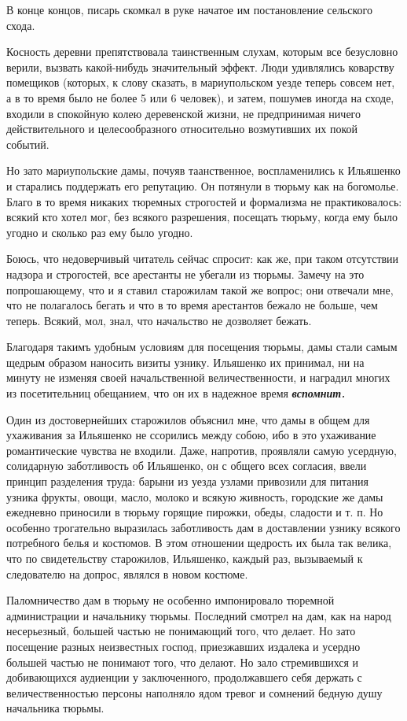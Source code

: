 \documentclass[a4paper,20pt]{report}
\begin{document}
В конце концов, писарь скомкал в руке начатое им постановление сельского схода.

Косность деревни препятствовала таинственным слухам, которым все безусловно
верили, вызвать какой-нибудь значительный эффект. Люди удивлялись коварству
помещиков (которых, к слову сказать, в мариупольском уезде теперь совсем нет, а
в то время было не более 5 или 6 человек), и затем, пошумев иногда на сходе,
входили в спокойную колею деревенской жизни, не предпринимая ничего
действительного и целесообразного относительно возмутивших их покой событий.

Но зато мариупольские дамы, почуяв таанственное, воспламенились к Ильяшенко и
старались поддержать его репутацию. Он потянули в тюрьму как на богомолье.
Благо в то время никаких тюремных строгостей и формализма не практиковалось:
всякий кто хотел мог, без всякого разрешения, посещать тюрьму, когда ему было
угодно и сколько раз ему было угодно.

Боюсь, что недоверчивый читатель сейчас спросит: как же, при таком отсутствии
надзора и строгостей, все арестанты не убегали из тюрьмы. Замечу на это
попрошающему, что и я ставил старожилам такой же вопрос; они отвечали мне, что
не полагалось бегать и что в то время арестантов бежало не больше, чем теперь.
Всякий, мол, знал, что начальство не дозволяет бежать.

Благодаря такимъ удобным условиям для посещения тюрьмы, дамы стали самым
щедрым образом наносить визиты узнику. Ильяшенко их принимал, ни на минуту не
изменяя своей начальственной величественности, и наградил многих из
посетительниц обещанием, что он их в надежное время \textbf{\em вспомнит.}

Один из достовернейших старожилов объяснил мне, что дамы в общем для ухаживания
за Ильяшенко не ссорились между собою, ибо в это ухаживание романтические
чувства не входили.  Даже, напротив, проявляли самую усердную, солидарную
заботливость об Ильяшенко, он с общего всех согласия, ввели принцип разделения
труда: барыни из уезда узлами привозили для питания узника фрукты, овощи,
масло, молоко и всякую живность, городские же дамы ежедневно приносили в тюрьму
горящие пирожки, обеды, сладости и т. п. Но особенно трогательно выразилась
заботливость дам в доставлении узнику всякого потребного белья и костюмов. В
этом отношении щедрость их была так велика, что по свидетельству старожилов,
Ильяшенко, каждый раз, вызываемый к следователю на допрос, являлся в новом
костюме.

Паломничество дам в тюрьму не особенно импонировало тюремной администрации и
начальнику тюрьмы. Последний смотрел на дам, как на народ несерьезный, большей
частью не понимающий того, что делает.  Но зато посещение разных неизвестных
господ, приезжавших издалека и усердно большей частью не понимают того, что
делают. Но зало стремившихся и добивающихся аудиенции у заключенного,
продолжавшего себя держать с величественностью персоны наполняло ядом тревог и
сомнений бедную душу начальника тюрьмы.
\end{document}
